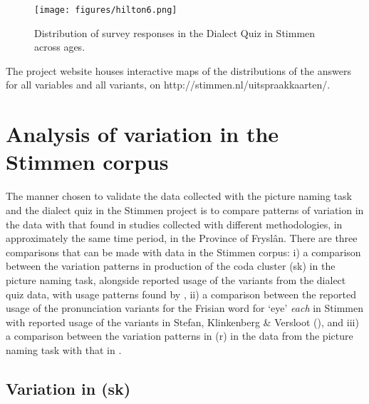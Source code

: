 \documentclass[output=paper,hidelinks]{langscibook}
\begin{document}
\begin{figure}
  \texttt{[image: figures/hilton6.png]}
  \caption{Distribution of survey responses in the Dialect Quiz in Stimmen across ages.}
 \label{fig:hilton:6}
\end{figure}



The project website houses interactive maps of the distributions of the answers for all variables and all variants, on http://stimmen.nl/uitspraakkaarten/. 

\section{Analysis of variation in the Stimmen corpus}

The manner chosen to validate the data collected with the picture naming task and the dialect quiz in the Stimmen project is to compare patterns of variation in the data with that found in studies collected with different methodologies, in approximately the same time period, in the Province of Fryslân. There are three comparisons that can be made with data in the Stimmen corpus: i) a comparison between the variation patterns in production of the coda cluster (sk) in the picture naming task, alongside reported usage of the variants from the dialect quiz data, with usage patterns found by \citet{HiltonWeening2014}, ii) a comparison between the reported usage of the pronunciation variants for the Frisian word for ‘eye’ \textit{each} in Stimmen with reported usage of the variants in Stefan, Klinkenberg \& Versloot (\citeyear{stefan2014frisian}), and iii) a comparison between the variation patterns in (r) in the data from the picture naming task with that in \citet{Bezooijen2009}.

\subsection{Variation in (sk)}
\end{document}

